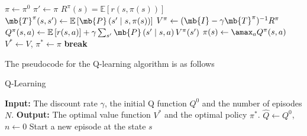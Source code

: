 \begin{exercise}
\begin{enumerate}
\begin{solution}
\begin{center}
\begin{minipage}{.8\linewidth}
\begin{algorithm}[H]
\begin{algorithmic}[1]
                                \STATE $\pi \gets \pi^0$
                                \LOOP
                                \STATE $\pi' \gets \pi$
                                \STATE $R^\pi(s) = \mathbb{E}\left[r(s, \pi(s))\right]$
                                \STATE $\mb{T}^\pi(s, s') \gets \mathbb{E}\left[\mb{P}\left(s' \mid s, \pi(s)\right)\right]$
                                \ENDFOR
                                \ENDFOR
                                \STATE $V^\pi \gets (\mb{I} - \gamma \mb{T}^\pi)^{-1} R^\pi$
                                \STATE $Q^\pi(s, a) \gets \mathbb{E}\left[r(s, a)\right] + \gamma \sum_{s'}\mb{P}\left(s' \mid s, a\right) V^\pi(s')$
                                \ENDFOR
                                \STATE $\pi(s) \gets \amax_{a} Q^\pi(s,a)$
                                \ENDFOR
                                \STATE $V^* \gets V$, $\pi^* \gets \pi$
                                \STATE \textbf{break}
                                \ENDIF
                                \ENDLOOP
                            \end{algorithmic}
                        \end{algorithm}
                    \end{minipage}
                \end{center}
                The pseudocode for the Q-learning algorithm is as follows
                \begin{center}
                    \begin{minipage}{.8\linewidth}
                        \begin{algorithm}[H]
                            \caption{Q-Learning}
                            \label{alg:ql}
                            \begin{algorithmic}[1]
                                \STATE \textbf{Input:} The discount rate $\gamma$, the initial Q function $Q^0$ and the number of episodes $N$.
                                \STATE \textbf{Output:} The optimal value function $V^*$ and the optimal policy $\pi^*$.
                                \STATE $\hat{Q} \gets Q^0$, $n \gets 0$
                                \STATE Start a new episode at the state $s$

\end{algorithmic}
\end{algorithm}
\end{minipage}
\end{center}
\end{solution}
\end{enumerate}
\end{exercise}
